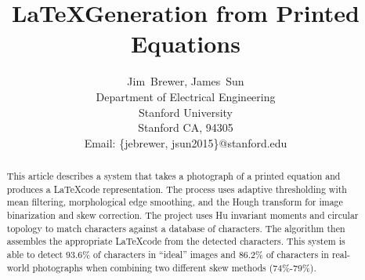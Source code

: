 \documentclass[journal]{IEEEtran}
\begin{document}
%
\title{\LaTeX Generation from Printed Equations}
%
%
%

\author{Jim~Brewer, James~Sun
        \\
        Department of Electrical Engineering\\
        Stanford University\\
        Stanford CA, 94305\\
        Email: \{jebrewer, jsun2015\}@stanford.edu}


\maketitle

\begin{abstract}
This article describes a system that takes a photograph of a printed equation and produces a \LaTeX code representation. The process uses adaptive thresholding with mean filtering, morphological edge smoothing, and the Hough transform for image binarization and skew correction. The project uses Hu invariant moments and circular topology to match characters against a database of characters. The algorithm then assembles the appropriate \LaTeX code from the detected characters. This system is able to detect 93.6\% of characters in “ideal” images and 86.2\% of characters in real-world photographs when combining two different skew methods (74\%-79\%).
\end{abstract}
\end{document}
